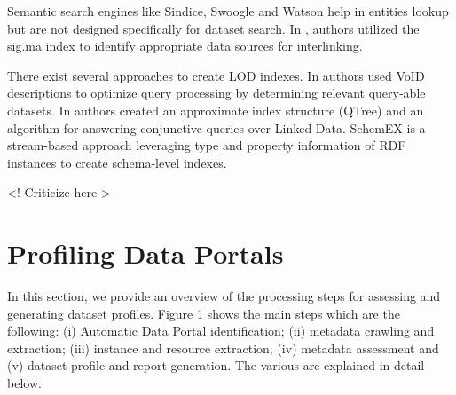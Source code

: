 \documentclass[runningheads,a4paper]{llncs}
\begin{document}
Semantic search engines like Sindice\cite{Delbru2010a}, Swoogle\cite{Ding2004} and Watson\cite{d'Aquin:2011:WMS:2019470.2019476} help in entities lookup but are not designed specifically for dataset search. In \cite{whatShouldILinkTo}, authors utilized the sig.ma index\cite{Tummarello10sig.ma:live} to identify appropriate data sources for interlinking.

There exist several approaches to create LOD indexes. In \cite{Alexander:LDOW09} authors used VoID descriptions to optimize query processing by determining relevant query-able datasets. In \cite{Harth:2010:DSO:1772690.1772733} authors created an approximate index structure (QTree) and an algorithm for answering conjunctive queries over Linked Data. SchemEX\cite{Konrath:2012:SEC:2399444.2399563} is a stream-based approach leveraging type and property information of RDF instances to create schema-level indexes.

<! Criticize here >


\section{Profiling Data Portals}
\label{sec:profiling data portals}

In this section, we provide an overview of the processing steps for assessing and generating dataset profiles. Figure 1 shows the main steps which are the following: (i) Automatic Data Portal identification; (ii) metadata crawling and extraction; (iii) instance and resource extraction; (iv) metadata assessment and (v) dataset profile and report generation. The various are explained in detail below.


\nocite{*}

\end{document}

